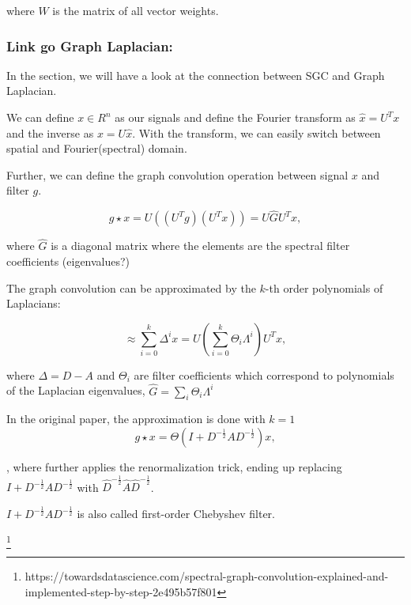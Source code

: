 where $W$ is the matrix of all vector weights.



\subsubsection{Link go Graph Laplacian:}

In the section, we will have a look at the connection between SGC and Graph Laplacian.

We can define $x \in R^n$ as our signals and define the Fourier transform as $\hat{x} = U^T x$
and the inverse as $x = U\hat{x}$. 
With the transform, we can easily switch between spatial and Fourier(spectral) domain.

Further, we can define the graph convolution operation between signal $x$ and filter $g$.

\begin{equation}
    g \star x = U((U^T g) (U^T x)) = U \hat{G} U^T x,
\end{equation}

where $\hat{G}$ is a diagonal matrix where the elements are the 
spectral filter coefficients (eigenvalues?)

The graph convolution can be approximated by the $k$-th order polynomials of Laplacians:

\begin{equation}
    \approx \sum_{i=0}^{k} \Delta^i x = U \left ( \sum_{i=0}^{k}  \Theta_i \Lambda^i \right ) U^T x,
\end{equation}

where $\Delta = D - A$ and $\Theta_i$ are 
filter coefficients which correspond to polynomials of the Laplacian eigenvalues,
 $\hat{G} = \sum_i \Theta_i \Lambda^i$


 In the original \cite{GCN} paper, the approximation is done with $k = 1$ 
 \begin{equation}
     g \star x = \Theta (I + D^{-\frac{1}{2}} A D^{-\frac{1}{2}} )x,
 \end{equation}

, where \citet{GCN} further applies the renormalization trick, ending up replacing
$I + D^{-\frac{1}{2}} A D^{-\frac{1}{2}}$ with $\hat{D}^{-\frac{1}{2}} \hat{A} \hat{D}^{-\frac{1}{2}}$.

$I + D^{-\frac{1}{2}} A D^{-\frac{1}{2}}$ is also called first-order Chebyshev filter.

\footnote{https://towardsdatascience.com/spectral-graph-convolution-explained-and-implemented-step-by-step-2e495b57f801}

